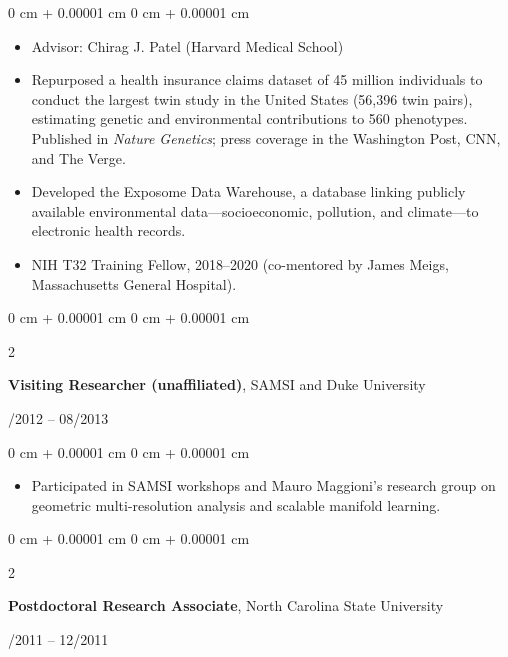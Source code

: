 \documentclass[10pt, letterpaper]{article}
\newenvironment{highlights}{
    \begin{itemize}[
        topsep=0.10 cm,
        parsep=0.10 cm,
        partopsep=0pt,
        itemsep=0pt,
        leftmargin=0 cm + 10pt
    ]
}{
    \end{itemize}
} %
\newenvironment{onecolentry}{
    \begin{adjustwidth}{
        0 cm + 0.00001 cm
    }{
        0 cm + 0.00001 cm
    }
}{
    \end{adjustwidth}
} %
\newenvironment{twocolentry}[2][]{
    \onecolentry
    \def\secondColumn{#2}
    \setcolumnwidth{\fill, 4.5 cm}
    \begin{paracol}{2}
}{
    \switchcolumn \raggedleft \secondColumn
    \end{paracol}
    \endonecolentry
} %
\begin{document}
        \vspace{0.10 cm}
        \begin{onecolentry}
            \begin{highlights}
               \item Advisor: Chirag J. Patel (Harvard Medical School)
                \item Repurposed a health insurance claims dataset of 45 million individuals to conduct the largest twin study in the United States (56,396 twin pairs), estimating genetic and environmental contributions to 560 phenotypes. Published in \textit{Nature Genetics}; press coverage in the Washington Post, CNN, and The Verge.
                \item Developed the Exposome Data Warehouse, a database linking publicly available environmental data---socioeconomic, pollution, and climate---to electronic health records.
                \item NIH T32 Training Fellow, 2018--2020 (co-mentored by James Meigs, Massachusetts General Hospital).
            \end{highlights}
        \end{onecolentry}

        \vspace{0.20 cm}


        \begin{twocolentry}{
            01/2012 – 08/2013
        }
            \textbf{Visiting Researcher (unaffiliated)}, SAMSI and Duke University
            \end{twocolentry}

        \vspace{0.10 cm}
        \begin{onecolentry}
            \begin{highlights}
                \item Participated in SAMSI workshops and Mauro Maggioni's research group on geometric multi-resolution analysis and scalable manifold learning.
            \end{highlights}
        \end{onecolentry}


        \vspace{0.20 cm}



        \begin{twocolentry}{
            08/2011 – 12/2011
        }
            \textbf{Postdoctoral Research Associate}, North Carolina State University
            \end{twocolentry}
\end{document}
